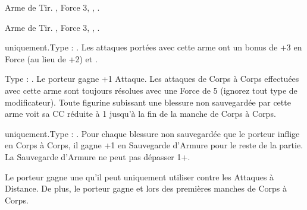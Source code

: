 \closearmynewsection




\vspace*{1.5cm}
\startarmyarmoury

\startitemlistonecol

\listitemonecol{\repeatercrossbow} Arme de Tir. , Force 3, , .

\listitemonecol{\repeaterhandbow} Arme de Tir. , Force 3, , \quicktofire{}.

\enditemlistonecol

\closearmyarmoury





\startarmymagicalitems

\armymagicalweapons

\startpricelist

\infantry{} uniquement.\newline Type : \gw{}. Les attaques portées avec cette arme ont un bonus de +3 en Force (au lieu de +2) et .

Type : \hw{}. Le porteur gagne +1 Attaque. Les attaques de Corps à Corps effectuées avec cette arme sont toujours résolues avec une Force de 5 (ignorez tout type de modificateur). Toute figurine subissant une blessure non sauvegardée par cette arme voit sa CC réduite à 1 jusqu'à la fin de la manche de Corps à Corps.

\endpricelist

\armymagicalarmour

\startpricelist

\infantry{} uniquement.\newline Type : \ha{}. Pour chaque blessure non sauvegardée que le porteur inflige en Corps à Corps, il gagne +1 en Sauvegarde d'Armure pour le reste de la partie. La Sauvegarde d'Armure ne peut pas dépasser 1+.

\endpricelist

\armytalismans

\startpricelist

Le porteur gagne une  qu'il peut uniquement utiliser contre les Attaques à Distance. De plus, le porteur gagne  et  lors des premières manches de Corps à Corps.

